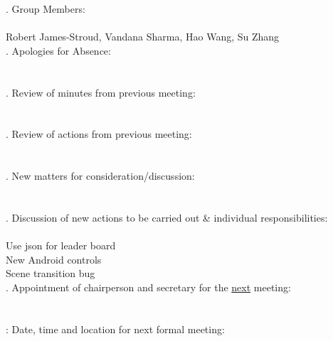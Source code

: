 \documentclass{article}
\begin{document}
. Group Members: \\\\ \indent Robert James-Stroud, Vandana Sharma, Hao Wang, Su Zhang \\

. Apologies for Absence: \\\\ \indent   \\

. Review of minutes from previous meeting: \\\\ \indent  \\

. Review of actions from previous meeting: \\\\ \indent \\

. New matters for consideration/discussion: \\\\ \indent  \\

. Discussion of new actions to be carried out \& individual responsibilities: \\\\ \indent Use json for leader board \\ \indent New Android controls \\ \indent Scene transition bug \\ 

. Appointment of chairperson and secretary for the \underline{next} meeting: \\\\ \indent  \\

: Date, time and location for next formal meeting: \\\\ \indent  \\
\end{document}
